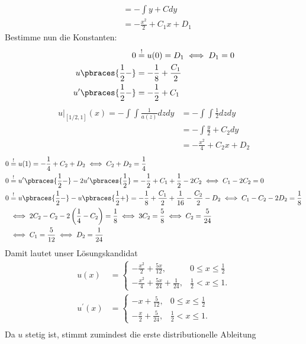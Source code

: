 \begin{solution}
\begin{align*}
  &= -\int y + C dy \\
  &= -\frac{x^2}{2} + C_1x + D_1
\end{align*}
Bestimme nun die Konstanten:
\begin{align*}
  0 &\stackrel{!}{=} u(0) = D_1 \iff D_1 = 0 \\
  u\pbraces{\frac{1}{2}-} &= -\frac{1}{8} + \frac{C_1}{2} \\
  u^{\prime}\pbraces{\frac{1}{2}-} &= -\frac{1}{2} + C_1
\end{align*}
\begin{align*}
  u|_{[1/2,1]}(x) = -\int\int \frac{1}{a(z)} dz dy  &=
  -\int\int \frac{1}{2} dz dy  \\
  &= -\int \frac{y}{2} + C_2 dy \\
  &= -\frac{x^2}{4} + C_2x + D_2
\end{align*}
\begin{align*}
  0 &\stackrel{!}{=} u(1) = -\frac{1}{4} + C_2 + D_2 \iff C_2 + D_2 = \frac{1}{4} \\
  0 &\stackrel{!}{=} u^{\prime}\pbraces{\frac{1}{2}-} - 2u^{\prime}\pbraces{\frac{1}{2}} =
  -\frac{1}{2} + C_1 + \frac{1}{2} - 2C_2 \iff C_1 - 2C_2 = 0 \\
  0 &\stackrel{!}{=} u\pbraces{\frac{1}{2}-} - u\pbraces{\frac{1}{2}+}
  = -\frac{1}{8} + \frac{C_1}{2} + \frac{1}{16} - \frac{C_2}{2} - D_2
  \iff C_1 - C_2 - 2D_2 = \frac{1}{8} \\
  &\iff 2C_2 - C_2 -2\left(\frac{1}{4} - C_2\right) = \frac{1}{8}
  \iff 3C_2  = \frac{5}{8} \iff C_2 = \frac{5}{24} \\
  &\iff C_1 = \frac{5}{12} \iff D_2 = \frac{1}{24}
\end{align*}
Damit lautet unser Lösungskandidat
\begin{align*}
  u(x) &= \begin{cases}
    -\frac{x^2}{2} + \frac{5x}{12}, & 0\leq x \leq \frac{1}{2} \\
    -\frac{x^2}{4} + \frac{5x}{24} + \frac{1}{24}, & \frac{1}{2} < x \leq 1.
  \end{cases} \\
  u^{\prime}(x) &= \begin{cases}
    -x + \frac{5}{12}, & 0\leq x \leq \frac{1}{2} \\
    -\frac{x}{2} + \frac{5}{24}, & \frac{1}{2} < x \leq 1.
  \end{cases} \\
\end{align*}
Da $u$ stetig ist, stimmt zumindest die erste distributionelle Ableitung

\end{solution}
